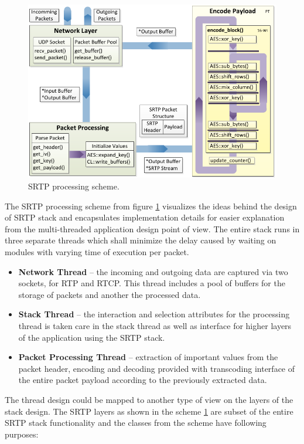 \begin{figure}[h!]
\centering
\includegraphics[width=15cm]{fig/paral_scheme.pdf}
\caption[SRTP processing scheme]{SRTP processing scheme.}
\label{scheme}
\end{figure}

The SRTP processing scheme from figure \ref{scheme} visualizes the ideas behind
the design of SRTP stack and encapsulates implementation details for easier
explanation from the multi-threaded application design point of view. 
The entire stack runs in three separate threads which shall minimize the delay 
caused by waiting on modules with varying time of execution per packet.
\begin{itemize}
\item \textbf{Network Thread} -- the incoming and outgoing data are captured
via two sockets, for RTP and RTCP. This thread includes a pool of buffers for
the storage of packets and another the processed data.
\item \textbf{Stack Thread} -- the interaction and selection attributes for
the processing thread is taken care in the stack thread as well as interface
for higher layers of the application using the SRTP stack.
\item \textbf{Packet Processing Thread} -- extraction of important values from
the packet header, encoding and decoding provided with transcoding interface of 
the entire packet payload according to the previously extracted data.
\end{itemize} 

The thread design could be mapped to another type of view on the layers of
the stack design. The SRTP layers as shown in the scheme \ref{scheme} are subset
of the entire SRTP stack functionality and the classes from the scheme have 
following purposes:

